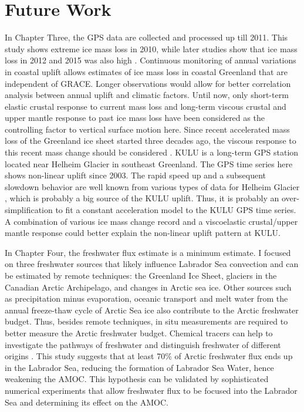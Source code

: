 \section{Future Work}
In Chapter Three, the GPS data are collected and processed up till 2011.  This study shows extreme ice mass loss in 2010, while later studies show that ice mass loss in 2012 and 2015 was also high \cite[e.g.,][]{hanna2014chpt6,tedesco2015chpt6}.  Continuous monitoring of annual variations in coastal uplift allows estimates of ice mass loss in coastal Greenland that are independent of GRACE.  Longer observations would allow for better correlation analysis between annual uplift and climatic factors.  Until now, only short-term elastic crustal response to current mass loss and long-term viscous crustal and upper mantle response to past ice mass loss have been considered as the controlling factor to vertical surface motion here.  Since recent accelerated mass loss of the Greenland ice sheet started three decades ago, the viscous response to this recent mass change should be considered \cite[e.g.,][]{nick2009chpt6,nield2014chpt6}.  KULU is a long-term GPS station located near Helheim Glacier in southeast Greenland.  The GPS time series here shows non-linear uplift since 2003.  The rapid speed up and a subsequent slowdown behavior are well known from various types of data for Helheim Glacier \cite[e.g.,][]{howat2005chpt6,nick2009chpt6}, which is probably a big source of the KULU uplift.  Thus, it is probably an over-simplification to fit a constant acceleration model to the KULU GPS time series.  A combination of various ice mass change record and a viscoelastic crustal/upper mantle response could better explain the non-linear uplift pattern at KULU.  

In Chapter Four, the freshwater flux estimate is a minimum estimate.  I  focused on three freshwater sources that likely influence Labrador Sea convection and can be estimated by remote techniques: the Greenland Ice Sheet, glaciers in the Canadian Arctic Archipelago, and changes in Arctic sea ice.  Other sources such as precipitation minus evaporation, oceanic transport and melt water from the annual freeze-thaw cycle of Arctic Sea ice also contribute to the Arctic freshwater budget.  Thus, besides remote techniques, in situ measurements are required to better measure the Arctic freshwater budget.  Chemical tracers can help to investigate the pathways of freshwater and distinguish freshwater of different origins \cite[]{haine2015chpt6}.  This study suggests that at least 70\% of Arctic freshwater flux ends up in the Labrador Sea, reducing the formation of Labrador Sea Water, hence weakening the AMOC.  This hypothesis can be validated by sophisticated numerical  experiments that allow freshwater flux to be focused into the Labrador Sea and determining its effect on the AMOC.  

